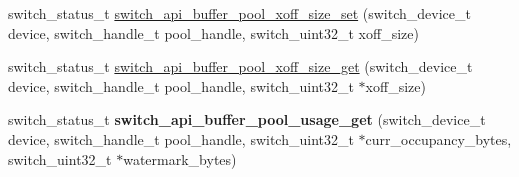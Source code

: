 \begin{DoxyCompactItemize}
\item 
switch\+\_\+status\+\_\+t \hyperlink{group__Buffer_ga01cdb23c0e6ade14991699884aedee6a}{switch\+\_\+api\+\_\+buffer\+\_\+pool\+\_\+xoff\+\_\+size\+\_\+set} (switch\+\_\+device\+\_\+t device, switch\+\_\+handle\+\_\+t pool\+\_\+handle, switch\+\_\+uint32\+\_\+t xoff\+\_\+size)
\item 
switch\+\_\+status\+\_\+t \hyperlink{group__Buffer_ga55df44ebe5585d9aa8c25410f5ed6f43}{switch\+\_\+api\+\_\+buffer\+\_\+pool\+\_\+xoff\+\_\+size\+\_\+get} (switch\+\_\+device\+\_\+t device, switch\+\_\+handle\+\_\+t pool\+\_\+handle, switch\+\_\+uint32\+\_\+t $\ast$xoff\+\_\+size)
\item 
\hypertarget{group__Buffer_ga470713a249100623ae079e49951da652}{switch\+\_\+status\+\_\+t {\bfseries switch\+\_\+api\+\_\+buffer\+\_\+pool\+\_\+usage\+\_\+get} (switch\+\_\+device\+\_\+t device, switch\+\_\+handle\+\_\+t pool\+\_\+handle, switch\+\_\+uint32\+\_\+t $\ast$curr\+\_\+occupancy\+\_\+bytes, switch\+\_\+uint32\+\_\+t $\ast$watermark\+\_\+bytes)}\label{group__Buffer_ga470713a249100623ae079e49951da652}

\end{DoxyCompactItemize}


